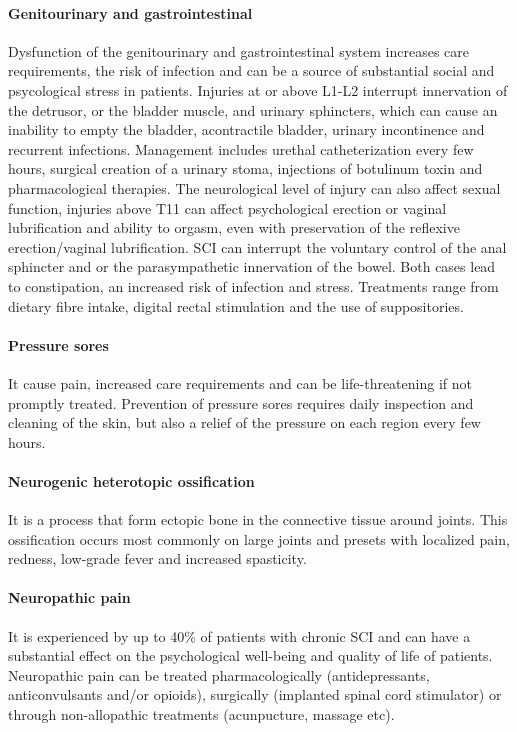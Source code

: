 \documentclass[12pt,article,oneside,a4paper]{memoir}
\begin{document}
\paragraph{Genitourinary and gastrointestinal}
Dysfunction of the genitourinary and gastrointestinal system increases care
requirements, the risk of infection and can be a source of substantial social
and psycological stress in patients. Injuries at or above L1-L2 interrupt
innervation of the detrusor, or the bladder muscle, and urinary sphincters,
which can cause an inability to empty the bladder, acontractile bladder, urinary
incontinence and recurrent infections. Management includes urethal catheterization
every few hours, surgical creation of a urinary stoma, injections of botulinum
toxin and pharmacological therapies. The neurological level of injury can also
affect sexual function, injuries above T11 can affect psychological erection or
vaginal lubrification and ability to orgasm, even with preservation of the
reflexive erection/vaginal lubrification. SCI can interrupt the voluntary control
of the anal sphincter and or the parasympathetic innervation of the bowel. Both
cases lead to constipation, an increased risk of infection and stress. Treatments
range from dietary fibre intake, digital rectal stimulation and the use of
suppositories.

\paragraph{Pressure sores}
It cause pain, increased care requirements and can be life-threatening if not
promptly treated. Prevention of pressure sores requires daily inspection and
cleaning of the skin, but also a relief of the pressure on each region every
few hours.

\paragraph{Neurogenic heterotopic ossification}
It is a process that form ectopic bone in the connective tissue around joints.
This ossification occurs most commonly on large joints and presets with localized
pain, redness, low-grade fever and increased spasticity.

\paragraph{Neuropathic pain}
It is experienced by up to 40\% of patients with chronic SCI and can have a
substantial effect on the psychological well-being and quality of life of
patients. Neuropathic pain can be treated pharmacologically (antidepressants,
anticonvulsants and/or opioids), surgically (implanted spinal cord stimulator)
or through non-allopathic treatments (acunpucture, massage etc).
\end{document}
